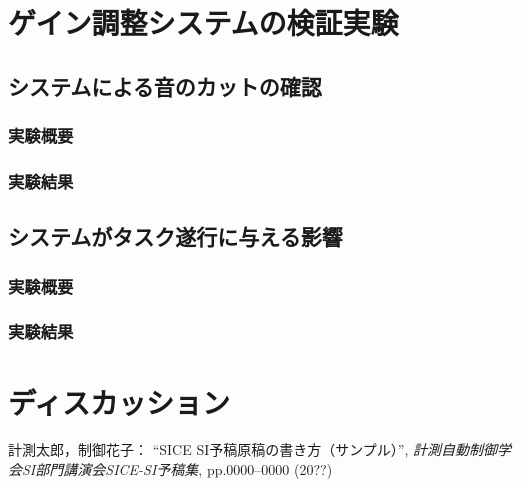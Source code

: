\documentclass[a4paper]{jarticle}
\begin{document}
\section{ゲイン調整システムの検証実験}
\subsection{システムによる音のカットの確認}
\subsubsection{実験概要}
\subsubsection{実験結果}
\subsection{システムがタスク遂行に与える影響}
\subsubsection{実験概要}
\subsubsection{実験結果}
\section{ディスカッション}
%
%
\begin{thebibliography}{99}
	計測太郎，制御花子：
	``SICE SI予稿原稿の書き方（サンプル）'',  
   {\it 計測自動制御学会SI部門講演会SICE-SI予稿集}, 
    pp.0000--0000 (20??)
\end{thebibliography}
%
%
%
\end{document}

